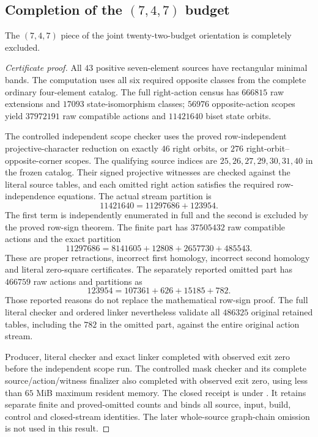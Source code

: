 \subsection{Completion of the $(7,4,7)$ budget}

\begin{proposition}
\label{CP2:A-oriented-eighteen-seven-four-seven}
The $(7,4,7)$ piece of the joint twenty-two-budget orientation is
completely excluded.
\end{proposition}
\begin{proof}[Certificate proof]
All $43$ positive seven-element sources have rectangular minimal bands.
The computation uses all six required opposite classes from the
complete ordinary four-element catalog.  The full right-action census
has $666815$ raw extensions and $17093$ state-isomorphism classes;
$56976$ opposite-action scopes yield $37972191$ raw compatible actions
and $11421640$ biset state orbits.

The controlled independent scope checker uses the proved
row-independent projective-character reduction on exactly $46$ right
orbits, or $276$ right-orbit--opposite-corner scopes.  The qualifying
source indices are $25,26,27,29,30,31,40$ in the frozen catalog.
Their signed projective witnesses are checked against the literal
source tables, and each omitted right action satisfies the required
row-independence equations.  The actual stream partition is
\[
 11421640=11297686+123954.
\]
The first term is independently enumerated in full and the second is
excluded by the proved row-sign theorem.  The finite part has
$37505432$ raw compatible actions and the exact partition
\[
 11297686=8141605+12808+2657730+485543.
\]
These are proper retractions, incorrect first homology, incorrect
second homology and literal zero-square certificates.  The separately
reported omitted part has $466759$ raw actions and partitions as
\[
 123954=107361+626+15185+782.
\]
Those reported reasons do not replace the mathematical row-sign proof.
The full literal checker and ordered linker nevertheless validate all
$486325$ original retained tables, including the $782$ in the omitted
part, against the entire original action stream.

Producer, literal checker and exact linker completed with observed
exit zero before the independent scope run.  The controlled mask
checker and its complete source/action/witness finalizer also completed
with observed exit zero, using less than $65$ MiB maximum resident
memory.  The closed receipt is
 under
.  It retains separate
finite and proved-omitted counts and binds all source, input, build,
control and closed-stream identities.  The later whole-source
graph-chain omission is not used in this result.
\end{proof}
